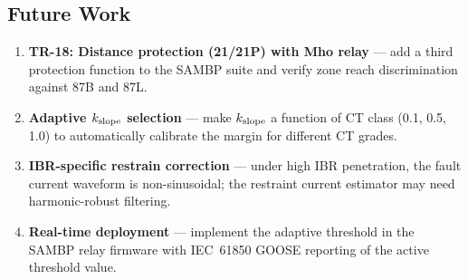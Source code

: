 \documentclass[11pt, a4paper]{article}
\begin{document}
\subsection{Future Work}

\begin{enumerate}
  \item \textbf{TR-18: Distance protection (21/21P) with Mho relay} ---
        add a third protection function to the SAMBP suite and verify
        zone reach discrimination against 87B and 87L.
  \item \textbf{Adaptive $k_{\rm slope}$ selection} --- make
        $k_{\rm slope}$ a function of CT class (0.1, 0.5, 1.0) to
        automatically calibrate the margin for different CT grades.
  \item \textbf{IBR-specific restrain correction} --- under high IBR
        penetration, the fault current waveform is non-sinusoidal; the
        restraint current estimator may need harmonic-robust filtering.
  \item \textbf{Real-time deployment} --- implement the adaptive threshold
        in the SAMBP relay firmware with IEC~61850 GOOSE reporting of
        the active threshold value.
\end{enumerate}




\end{document}
